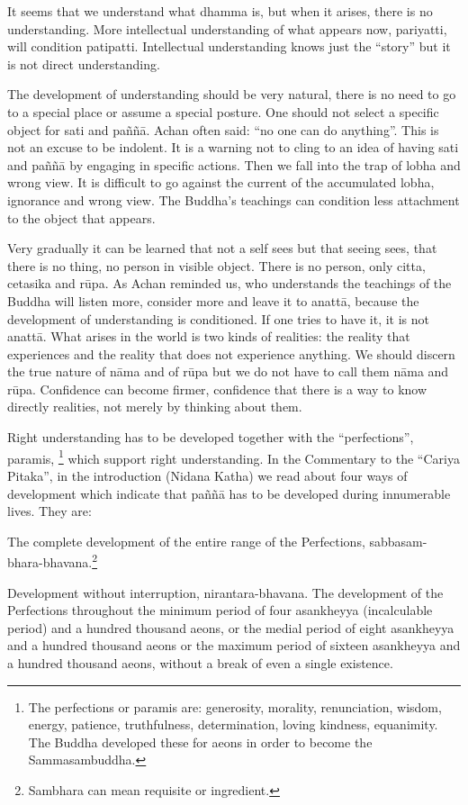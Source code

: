 It seems that we understand what dhamma is, but when it arises, there is no understanding. More intellectual understanding of what appears now, pariyatti, will condition patipatti. Intellectual understanding knows just the ``story'' but it is not direct understanding. 

The development of understanding should be very natural, there is no need to go to a 
special place or assume a special posture. One should not select a specific object for 
sati and paññā.  Achan often said: ``no one can do anything''. This is not an excuse to 
be indolent. It is a warning not to cling to an idea of having sati and paññā by engaging in specific actions. Then we fall into the trap of lobha and wrong view. It is difficult to go against the current of the accumulated lobha, ignorance and wrong view. The Buddha’s teachings can condition less attachment to the object that appears. 

Very gradually it can be learned that not a self sees but that seeing sees, that there is 
no thing, no person in visible object. There is no person, only citta, cetasika and rūpa. 
As  Achan reminded us, who understands the teachings of the Buddha will listen 
more, consider more and leave it to anattā, because the development of understanding 
is conditioned. If one tries to have it, it is not anattā. What arises in the world is two 
kinds of realities: the reality that experiences and the reality that does not experience 
anything. We should discern the true nature of nāma and of rūpa but we do not have 
to call them nāma and rūpa. Confidence can become firmer, confidence that there is a 
way to know directly realities, not merely by thinking about them. 

Right understanding has to be developed together with the ``perfections'', paramis, \footnote{The perfections or paramis are: generosity, morality, renunciation, wisdom, energy, patience, 
truthfulness, determination, loving kindness, equanimity. The Buddha developed these for aeons in 
order to become the Sammasambuddha. }
which support right understanding. In the Commentary to the ``Cariya Pitaka'', in the 
introduction (Nidana Katha) we read about four ways of development which indicate 
that paññā has to be developed during innumerable lives. They are: 

The complete development of the entire range of the Perfections, sabbasam-bhara-bhavana.\footnote{Sambhara can mean requisite or ingredient.} 

Development without interruption, nirantara-bhavana. The development of the 
Perfections throughout the minimum period of four asankheyya (incalculable 
period) and a hundred thousand aeons, or the medial period of eight 
asankheyya and a hundred thousand aeons or the maximum period of sixteen 
asankheyya and a hundred thousand aeons, without a break of even a single existence. 







